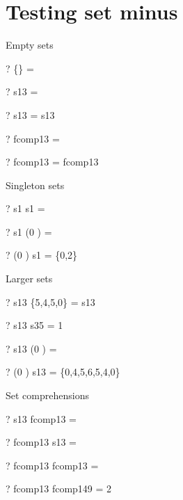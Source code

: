 \documentclass{article}
\begin{document}
\section{Testing set minus}
Empty sets
\begin{zed} \vdash?  \{\}      \setminus \emptyset[\nat] = \emptyset \end{zed}
\begin{zed} \vdash?  \emptyset \setminus s13         = \emptyset \end{zed}
\begin{zed} \vdash?  s13       \setminus \emptyset   = s13 \end{zed}
\begin{zed} \vdash?  \emptyset \setminus fcomp13     = \emptyset \end{zed}
\begin{zed} \vdash?  fcomp13   \setminus \emptyset   = fcomp13 \end{zed}
Singleton sets
\begin{zed} \vdash?  s1        \setminus s1          = \emptyset \end{zed}
\begin{zed} \vdash?  s1        \setminus (0 ) = \emptyset \end{zed}
\begin{zed} \vdash?  (0 ) \setminus s1        = \{0,2\} \end{zed}
Larger sets
\begin{zed} \vdash?  s13       \setminus \{5,4,5,0\} = s13 \end{zed}
\begin{zed} \vdash?  s13       \setminus s35         = 1  \end{zed}
\begin{zed} \vdash?  s13       \setminus (0 ) = \emptyset \end{zed}
\begin{zed} \vdash?  (0 ) \setminus s13 = \{0,4,5,6,5,4,0\}\end{zed}
Set comprehensions
\begin{zed} \vdash?  s13       \setminus fcomp13     = \emptyset \end{zed}
\begin{zed} \vdash?  fcomp13   \setminus s13         = \emptyset \end{zed}
\begin{zed} \vdash?  fcomp13   \setminus fcomp13     = \emptyset \end{zed}
\begin{zed} \vdash?  fcomp13   \setminus fcomp149    = 2  \end{zed}
\end{document}
